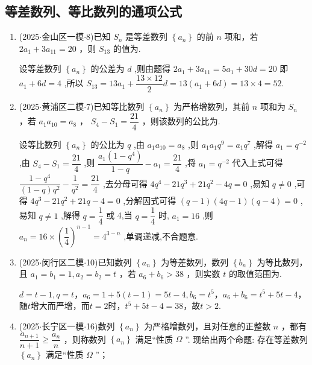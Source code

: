 \subsection*{等差数列、等比数列的通项公式}
\begin{enumerate}
    \item (2025$\cdot$金山区一模$\cdot$8)已知 ${S}_{n}$ 是等差数列 $\left\{  {a}_{n}\right\}$ 的前 $n$ 项和，若 $2{a}_{1} + 3{a}_{11} = {20}$ ，则 ${S}_{13}$ 的值为.
    \begin{jieda}
        设等差数列 $\left\{  {a}_{n}\right\}$ 的公差为 $d$ ,则由题得 $2{a}_{1} + 3{a}_{11} =  5{a}_{1} + {30d} = {20}$ 即 ${a}_{1} + {6d} = 4$ ,所以 ${S}_{13} = {13}{a}_{1} + \dfrac{{13} \times  {12}}{2}d =  {13}\left( {{a}_{1} + {6d}}\right)  = {13} \times  4 = {52}$.
    \end{jieda}
    \item (2025$\cdot$黄浦区二模$\cdot$7)已知等比数列 $\left\{  {a}_{n}\right\}$ 为严格增数列，其前 $n$ 项和为 ${S}_{n}$ ，若 ${a}_{1}{a}_{10} = {a}_{8}$ ， ${S}_{4} - {S}_{1} = \dfrac{21}{4}$ ，则该数列的公比为.
    \begin{jieda}
        设等比数列 $\left\{  {a}_{n}\right\}$ 的公比为 $q$ ,由 ${a}_{1}{a}_{10} = {a}_{8}$ ,则 ${a}_{1}{a}_{1}{q}^{9} = {a}_{1}{q}^{7}$ ,解得 ${a}_{1} = {q}^{-2}$ ,由 ${S}_{4} - {S}_{1} = \dfrac{21}{4}$ ,则 $\dfrac{{a}_{1}\left( {1 - {q}^{4}}\right) }{1 - q} -  {a}_{1} = \dfrac{21}{4}$ ,将 ${a}_{1} = {q}^{-2}$ 代入上式可得 $\dfrac{1 - {q}^{4}}{\left( {1 - q}\right) {q}^{2}} - \dfrac{1}{{q}^{2}} = \dfrac{21}{4}$ ,去分母可得 $4{q}^{4} - {21}{q}^{3} + {21}{q}^{2} - {4q} = 0$ ,易知 $q \neq  0$ ,可得 $4{q}^{3} - {21}{q}^{2}  + {21q} - 4 = 0$ ,分解因式可得 $\left( {q - 1}\right) \left( {{4q} - 1}\right) \left( {q - 4}\right)  = 0$ ,易知 $q \neq  1$ ,解得 $q = \dfrac{1}{4}$ 或 4,当 $q = \dfrac{1}{4}$ 时, ${a}_{1} = {16}$ ,则 ${a}_{n} = {16} \times  {\left( \dfrac{1}{4}\right) }^{n - 1} = {4}^{3 - n}$ ,单调递减,不合题意.
    \end{jieda}
    \item (2025$\cdot$闵行区二模$\cdot$10)已知数列 $\left\{  {a}_{n}\right\}$ 为等差数列，数列 $\left\{  {b}_{n}\right\}$ 为等比数列，且 ${a}_{1} = {b}_{1} = 1,{a}_{2} = {b}_{2} =  t$ ，若 ${a}_{6} + {b}_{6} > {38}$ ，则实数 $t$ 的取值范围为.
    \begin{jieda}
        $d = t - 1, q = t$，$a_6 = 1+5(t-1) = 5t-4, b_6 = t^5$，$a_6+b_6 = t^5+5t-4$，随$t$增大而严增，而$t = 2$时，$t^5+5t-4 = 38$，故$t > 2$.
    \end{jieda}
    \item (2025$\cdot$长宁区一模$\cdot$16)数列 $\left\{  {a}_{n}\right\}$ 为严格增数列，且对任意的正整数 $n$ ，都有 $\dfrac{{a}_{n + 1}}{n + 1} \geq  \dfrac{{a}_{n}}{n}$ ，则称数列 $\left\{  {a}_{n}\right\}$ 满足“性质 $\Omega$ ”. 现给出两个命题:
      存在等差数列 $\left\{  {a}_{n}\right\}$ 满足“性质 $\Omega$ ”；


\end{enumerate}

